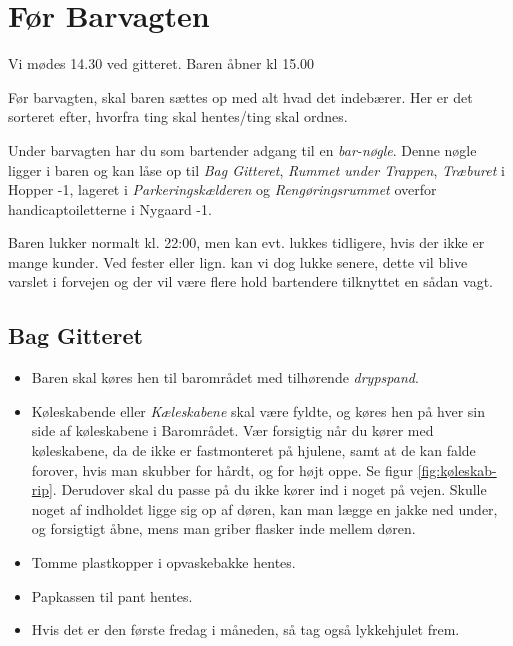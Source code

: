 \section{Før Barvagten}
\label{sec:pre-barvagten}

Vi mødes 14.30 ved gitteret. Baren åbner kl 15.00

Før barvagten, skal baren sættes op med alt hvad det indebærer. Her er
det sorteret efter, hvorfra ting skal hentes/ting skal ordnes.

Under barvagten har du som bartender adgang til en \textit{bar-nøgle}.
Denne nøgle ligger i baren og kan låse op til \textit{Bag Gitteret},
\textit{Rummet under Trappen}, \textit{Træburet} i Hopper -1,
lageret i \textit{Parkeringskælderen} og
\textit{Rengøringsrummet} overfor handicaptoiletterne i Nygaard -1.

Baren lukker normalt kl. 22:00, men kan evt. lukkes tidligere, hvis der ikke er mange kunder.
Ved fester eller lign. kan vi dog lukke senere, dette vil blive varslet i forvejen og der vil
være flere hold bartendere tilknyttet en sådan vagt.

\subsection{Bag Gitteret}
\label{sec:pre:bag-ved-gitteret}

\begin{itemize}
	\item Baren skal køres hen til barområdet med tilhørende \textit{drypspand}.
	\item Køleskabende eller \textit{Kæleskabene} skal være fyldte, og køres hen på hver sin side af køleskabene i
	Barområdet. Vær forsigtig når du kører med køleskabene, da de ikke er fastmonteret på hjulene,
	samt at de kan falde forover, hvis man skubber for hårdt, og for højt oppe. Se figur \ref{fig:køleskab-rip}. Derudover skal
	du passe på du ikke kører ind i noget på vejen. Skulle noget af indholdet ligge sig op af døren, kan man lægge en jakke
	ned under, og forsigtigt åbne, mens man griber flasker inde mellem døren.
	\item Tomme plastkopper i opvaskebakke hentes.
	\item Papkassen til pant hentes.
	\item Hvis det er den første fredag i måneden, så tag også lykkehjulet frem.
\end{itemize}

